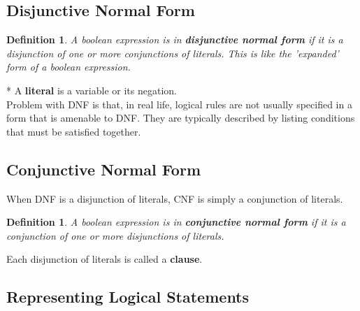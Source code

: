 \documentclass[12pt,a4paper]{article}
\newtheorem{definition}[theorem]{Definition}
\begin{document}
\subsection{Disjunctive Normal Form}

\begin{definition}
A boolean expression is in \textbf{disjunctive normal form} if it is a disjunction of one or more conjunctions of literals. This is like the 'expanded' form of a boolean expression.
\end{definition}
* A \textbf{literal} is a variable or its negation. \\[-0.5em]

Problem with DNF is that, in real life, logical rules are not usually specified
in a form that is amenable to DNF. They are typically described by listing conditions that
must be satisfied together. 

\subsection{Conjunctive Normal Form}

When DNF is a disjunction of literals, CNF is simply a conjunction of literals.

\begin{definition}
A boolean expression is in \textbf{conjunctive normal form} if it is a conjunction of one or more disjunctions of literals.
\end{definition}

Each disjunction of literals is called a \textbf{clause}.

\subsection{Representing Logical Statements}
\end{document}
